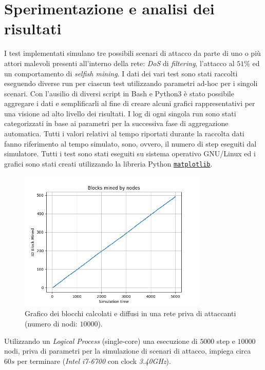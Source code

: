 \chapter{Sperimentazione e analisi dei risultati}

I test implementati simulano tre possibili scenari di attacco da parte di uno o più attori malevoli presenti all'interno della rete: \textit{DoS} di \textit{filtering}, l'attacco al $51\%$ ed un comportamento di \textit{selfish mining}.\newline
I dati dei vari test sono stati raccolti eseguendo diverse run per ciascun test utilizzando parametri ad-hoc per i singoli scenari. Con l'ausilio di diversi script in Bash e Python3 è stato possibile aggregare i dati e semplificarli al fine di creare alcuni grafici rappresentativi per una visione ad alto livello dei risultati. I log di ogni singola run sono stati categorizzati in base ai parametri per la successiva fase di aggregazione automatica. Tutti i valori relativi al tempo riportati durante la raccolta dati fanno riferimento al tempo simulato, sono, ovvero, il numero di step eseguiti dal simulatore.
Tutti i test sono stati eseguiti su sistema operativo GNU/Linux ed i grafici sono stati creati utilizzando la libreria Python \href{https://matplotlib.org/}{\texttt{matplotlib}}.\newline
\begin{figure}
    \centering
    \includegraphics[width=0.8\textwidth]{./images/all-test-51-1.png}
    \caption{Grafico dei blocchi calcolati e diffusi in una rete priva di attaccanti (numero di nodi: $10000$).}
\end{figure}
Utilizzando un \textit{Logical Process} (single-core) una esecuzione di $5000$ step e $10000$ nodi, priva di parametri per la simulazione di scenari di attacco, impiega circa $60s$ per terminare (\textit{Intel i7-6700} con clock \textit{3.40GHz}).\newline

